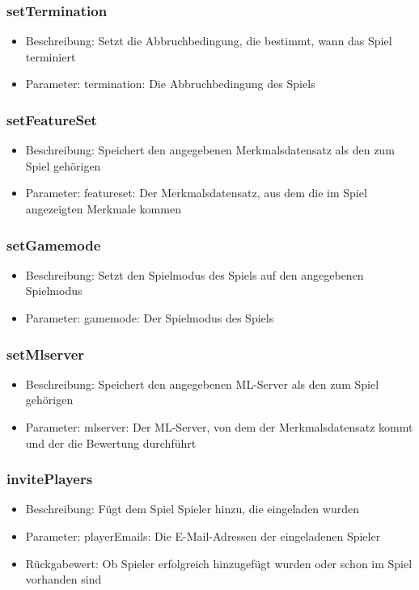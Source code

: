 \documentclass[a4paper]{scrreprt}
\begin{document}
    \subsubsection{setTermination}
    \begin{itemize}
        \item Beschreibung: Setzt die Abbruchbedingung, die bestimmt, wann das Spiel terminiert
        \item Parameter: termination: Die Abbruchbedingung des Spiels
    \end{itemize}
    \subsubsection{setFeatureSet}
    \begin{itemize}
        \item Beschreibung: Speichert den angegebenen Merkmalsdatensatz als den zum Spiel gehörigen
        \item Parameter: featureset: Der Merkmalsdatensatz, aus dem die im Spiel angezeigten Merkmale kommen
    \end{itemize}
    \subsubsection{setGamemode}
    \begin{itemize}
        \item Beschreibung: Setzt den Spielmodus des Spiels auf den angegebenen Spielmodus
        \item Parameter: gamemode: Der Spielmodus des Spiels
    \end{itemize}
    \subsubsection{setMlserver}
    \begin{itemize}
        \item Beschreibung: Speichert den angegebenen ML-Server als den zum Spiel gehörigen
        \item Parameter: mlserver: Der ML-Server, von dem der Merkmalsdatensatz kommt und der die Bewertung durchführt
    \end{itemize}
    \subsubsection{invitePlayers}
    \begin{itemize}
        \item Beschreibung: Fügt dem Spiel Spieler hinzu, die eingeladen wurden
        \item Parameter: playerEmails: Die E-Mail-Adressen der eingeladenen Spieler
        \item Rückgabewert: Ob Spieler erfolgreich hinzugefügt wurden oder schon im Spiel vorhanden sind
    \end{itemize}
\end{document}
